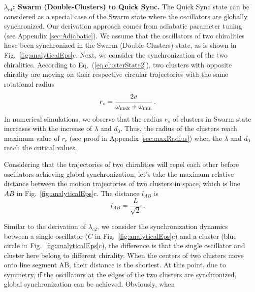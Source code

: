 \documentclass[%
 aip,
 amsmath,amssymb,
 reprint,%
]{revtex4-1}
\begin{document}
\vspace{0.25cm}
\noindent\textbf{$\lambda_{c4}$: Swarm (Double-Clusters) to Quick Sync.}
The Quick Sync state can be considered as a special case of the Swarm state where the oscillators are globally synchronized. Our derivation approach comes from adiabatic parameter tuning (see Appendix \ref{sec:Adiabatic}). We assume that the oscillators of two chiralities have been synchronized in the Swarm (Double-Clusters) state, as is shown in Fig.~\ref{fig:analyticalEps}c. Next, we consider the synchronization of the two chiralities. According to Eq.~(\ref{eq:clusterState2}), two clusters with opposite chirality are moving on their respective circular trajectories with the same rotational radius
\begin{equation}
    r_c = \cfrac{2v}{\omega_{\max}+\omega_{\min}}\;.
\end{equation}
In numerical simulations, we observe that the radius $r_s$ of clusters in Swarm state increases with the increase of $\lambda$ and $d_0$. Thus, the radius of the clusters reach maximum value of $r_c$ (see proof in Appendix \ref{sec:maxRadius}) when the $\lambda$ and $d_0$ reach the critical values.

Considering that the trajectories of two chiralities will repel each other before oscillators achieving global synchronization, let's take the maximum relative distance between the motion trajectories of two clusters in space, which is line $AB$ in Fig.~\ref{fig:analyticalEps}c. The distance $l_{AB}$ is
\begin{equation}
    l_{AB}=\frac{L}{\sqrt{2}}\;.
\end{equation}

Similar to the derivation of $\lambda_{c2}$, we consider the synchronization dynamics between a single oscillator ($C$ in Fig.~\ref{fig:analyticalEps}c) and a cluster (blue circle in Fig.~\ref{fig:analyticalEps}c), the difference is that the single oscillator and cluster here belong to different chirality. When the centers of two clusters move onto line segment AB, their distance is the shortest. At this point, due to symmetry, if the oscillators at the edges of the two clusters are synchronized, global synchronization can be achieved. Obviously, when 
\end{document}
